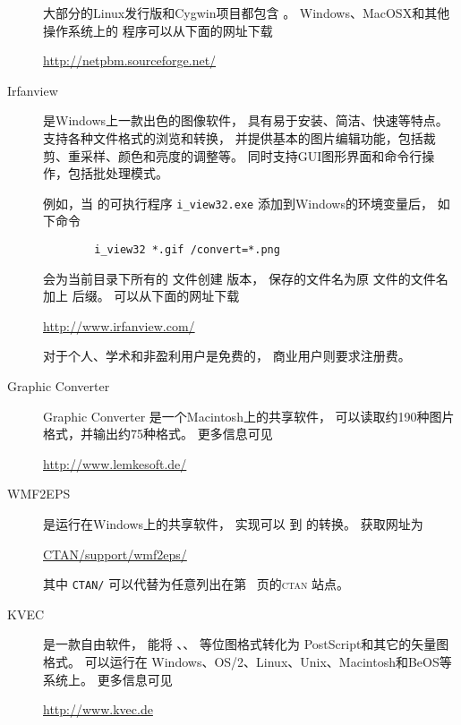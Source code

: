 \begin{description}
	大部分的Linux发行版和Cygwin项目都包含 。
	Windows、MacOSX和其他操作系统上的  程序可以从下面的网址下载
	\begin{center}
		\url{http://netpbm.sourceforge.net/}
	\end{center}
	
	\item[Irfanview]
	
	 是Windows上一款出色的图像软件，
	具有易于安装、简洁、快速等特点。
	 支持各种文件格式的浏览和转换，
	并提供基本的图片编辑功能，包括裁剪、重采样、颜色和亮度的调整等。
	 同时支持GUI图形界面和命令行操作，包括批处理模式。
	
	例如，当 的可执行程序 \verb|i_view32.exe| 添加到Windows的环境变量后，
	如下命令
\begin{verbatim}
		i_view32 *.gif /convert=*.png
\end{verbatim}
	会为当前目录下所有的  文件创建  版本，
	保存的文件名为原  文件的文件名加上  后缀。
	 可以从下面的网址下载
	\begin{center}
		\url{http://www.irfanview.com/}
	\end{center}
	 对于个人、学术和非盈利用户是免费的，
	商业用户则要求注册费。
	
	\item[Graphic Converter]
	
	Graphic Converter 是一个Macintosh上的共享软件，
	可以读取约190种图片格式，并输出约75种格式。
	更多信息可见
	\begin{center}
		\url{http://www.lemkesoft.de/}
	\end{center}
	
	\item[WMF2EPS]
	
	 是运行在Windows上的共享软件，
	实现可以  到  的转换。
	获取网址为
	\begin{center}
		\href{http://www.ctan.org/tex-archive/support/wmf2eps}{CTAN/support/wmf2eps/}
	\end{center}
	其中 \texttt{CTAN/} 可以代替为任意列出在第~\pageref{ctan-sites} 页的\textsc{ctan} 站点。
	
	\item[KVEC]
	
	 是一款自由软件，
	能将 、、 等位图格式转化为 PostScript和其它的矢量图格式。
	 可以运行在 Windows、OS/2、Linux、Unix、Macintosh和BeOS等系统上。
	更多信息可见
	\begin{center}
		\url{http://www.kvec.de}
	\end{center}
	

\end{description}
